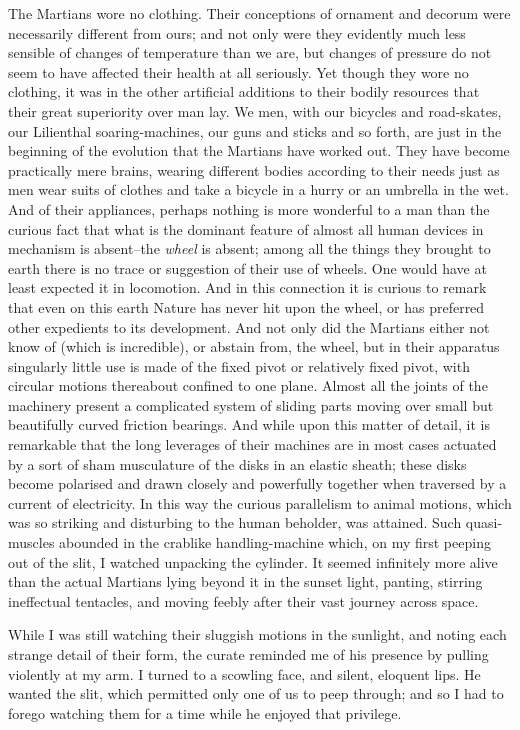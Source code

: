 The Martians wore no clothing. Their conceptions of ornament and
decorum were necessarily different from ours; and not only were
they evidently much less sensible of changes of temperature than we
are, but changes of pressure do not seem to have affected their
health at all seriously. Yet though they wore no clothing, it was
in the other artificial additions to their bodily resources that
their great superiority over man lay. We men, with our bicycles and
road-skates, our Lilienthal soaring-machines, our guns and sticks
and so forth, are just in the beginning of the evolution that the
Martians have worked out. They have become practically mere brains,
wearing different bodies according to their needs just as men wear
suits of clothes and take a bicycle in a hurry or an umbrella in
the wet. And of their appliances, perhaps nothing is more wonderful
to a man than the curious fact that what is the dominant feature of
almost all human devices in mechanism is absent--the \emph{wheel}
is absent; among all the things they brought to earth there is no
trace or suggestion of their use of wheels. One would have at least
expected it in locomotion. And in this connection it is curious to
remark that even on this earth Nature has never hit upon the wheel,
or has preferred other expedients to its development. And not only
did the Martians either not know of (which is incredible), or
abstain from, the wheel, but in their apparatus singularly little
use is made of the fixed pivot or relatively fixed pivot, with
circular motions thereabout confined to one plane. Almost all the
joints of the machinery present a complicated system of sliding
parts moving over small but beautifully curved friction bearings.
And while upon this matter of detail, it is remarkable that the
long leverages of their machines are in most cases actuated by a
sort of sham musculature of the disks in an elastic sheath; these
disks become polarised and drawn closely and powerfully together
when traversed by a current of electricity. In this way the curious
parallelism to animal motions, which was so striking and disturbing
to the human beholder, was attained. Such quasi-muscles abounded in
the crablike handling-machine which, on my first peeping out of the
slit, I watched unpacking the cylinder. It seemed infinitely more
alive than the actual Martians lying beyond it in the sunset light,
panting, stirring ineffectual tentacles, and moving feebly after
their vast journey across space.

While I was still watching their sluggish motions in the sunlight,
and noting each strange detail of their form, the curate reminded
me of his presence by pulling violently at my arm. I turned to a
scowling face, and silent, eloquent lips. He wanted the slit, which
permitted only one of us to peep through; and so I had to forego
watching them for a time while he enjoyed that privilege.

